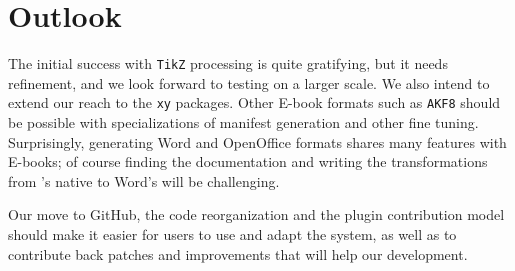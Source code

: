 \documentclass{llncs}
\def\ebook{\mbox{E-book}\xspace}
\def\tikz{\texttt{TikZ}\xspace}
\begin{document}
\section{Outlook}
The initial success with \tikz processing is quite
gratifying, but it needs refinement, and we look forward to testing
on a larger scale. We also intend
to extend our reach to the \texttt{xy} packages.
Other {\ebook} formats such as \texttt{AKF8} should be possible with
specializations of manifest generation and other fine tuning.
Surprisingly, generating Word and OpenOffice formats shares many features
with {\ebook}s; of course finding the documentation and writing the {\XSLT}
transformations from \LaTeXML's native {\XML} to Word's will be challenging.

Our move to GitHub, the code reorganization and the plugin contribution model should make it easier
for users to use and adapt the system, as well as to contribute
back patches and improvements that will help our development.

\printbibliography
\end{document}

